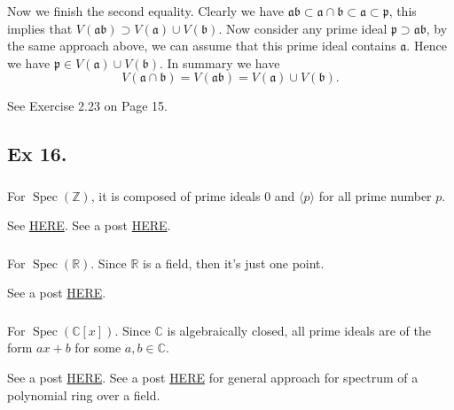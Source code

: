 \noindent Now we finish the second equality. Clearly we have $\mathfrak a\mathfrak b\subset \mathfrak a\cap \mathfrak b\subset \mathfrak a\subset \mathfrak p$, this implies that $V(\mathfrak{ab})\supset V(\mathfrak a)\cup V(\mathfrak b)$. Now consider any prime ideal $\mathfrak p\supset \mathfrak {ab}$, by the same approach above, we can assume that this prime ideal contains $\mathfrak a$. Hence we have $\mathfrak p\in V(\mathfrak a)\cup V(\mathfrak b)$.
In summary we have $$V(\mathfrak a\cap \mathfrak b)=V(\mathfrak{ab})=V(\mathfrak a)\cup V(\mathfrak b).$$

See \cite{altman} Exercise 2.23 on Page 15. 



\subsection{Ex 16.}

\subsubsection{}
For $\operatorname{Spec}(\mathbb Z)$, it is composed of prime ideals $0$ and $\langle p\rangle$ for all prime number $p$.

See \href{https://ncatlab.org/nlab/show/Spec%28Z%29}{HERE}. 
See a post \href{https://math.stackexchange.com/questions/4008952/drawing-a-picture-of-operatornamespec-mathbbz}{HERE}. 

\subsubsection{}
For $\operatorname{Spec}(\mathbb R)$.
Since $\mathbb R$ is a field, then it's just one point.

See a post \href{https://math.stackexchange.com/questions/1258959/prime-ideals-in-a-field}{HERE}. 

\subsubsection{}
For $\operatorname{Spec}(\mathbb C[x])$.
Since $\mathbb C$ is algebraically closed, all prime ideals are of the form $ax+b$ for some $a,b\in\mathbb C$.

See a post \href{https://math.stackexchange.com/questions/838431/studying-operatornamespec-mathbbzx-operatornamespec-mathbbrx}{HERE}.
See a post \href{https://math.stackexchange.com/questions/1856918/comparing-the-prime-spectra-of-mathbbqx-mathbbrx-and-mathbbcx}{HERE} for general approach for spectrum of a polynomial ring over a field.


